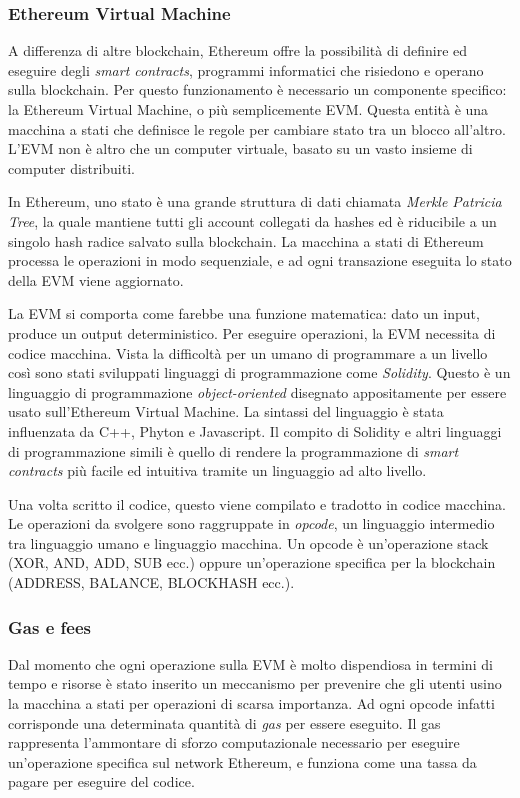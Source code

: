 \subsubsection{Ethereum Virtual Machine}

A differenza di altre blockchain, Ethereum offre la possibilità di definire ed eseguire degli \textit{smart contracts}, programmi informatici che risiedono e operano sulla blockchain.
Per questo funzionamento è necessario un componente specifico: la Ethereum Virtual Machine, o più semplicemente EVM.
Questa entità è una macchina a stati che definisce le regole per cambiare stato tra un blocco all'altro.
L'EVM non è altro che un computer virtuale, basato su un vasto insieme di computer distribuiti. \cite{ethereum-virtual-machine}

In Ethereum, uno stato è una grande struttura di dati chiamata \textit{Merkle Patricia Tree}, la quale mantiene tutti gli account collegati da hashes ed è riducibile a un singolo hash radice salvato sulla blockchain.
La macchina a stati di Ethereum processa le operazioni in modo sequenziale, e ad ogni transazione eseguita lo stato della EVM viene aggiornato.

La EVM si comporta come farebbe una funzione matematica: dato un input, produce un output deterministico.
Per eseguire operazioni, la EVM necessita di codice macchina.
Vista la difficoltà per un umano di programmare a un livello così sono stati sviluppati linguaggi di programmazione come \textit{Solidity}.
Questo è un linguaggio di programmazione \textit{object-oriented} disegnato appositamente per essere usato sull'Ethereum Virtual Machine.
La sintassi del linguaggio è stata influenzata da C++, Phyton e Javascript. \cite{solidity}
Il compito di Solidity e altri linguaggi di programmazione simili è quello di rendere la programmazione di \textit{smart contracts} più facile ed intuitiva tramite un linguaggio ad alto livello.


Una volta scritto il codice, questo viene compilato e tradotto in codice macchina.
Le operazioni da svolgere sono raggruppate in \textit{opcode}, un linguaggio intermedio tra linguaggio umano e linguaggio macchina.
Un opcode è un'operazione stack (XOR, AND, ADD, SUB ecc.) oppure un'operazione specifica per la blockchain (ADDRESS, BALANCE, BLOCKHASH ecc.).

\subsubsection{Gas e fees}
Dal momento che ogni operazione sulla EVM è molto dispendiosa in termini di tempo e risorse è stato inserito un meccanismo per prevenire che gli utenti usino la macchina a stati per operazioni di scarsa importanza.
Ad ogni opcode infatti corrisponde una determinata quantità di \textit{gas} per essere eseguito.
Il gas rappresenta l'ammontare di sforzo computazionale necessario per eseguire un'operazione specifica sul network Ethereum, e funziona come una tassa da pagare per eseguire del codice. \cite{gas-and-fees}

